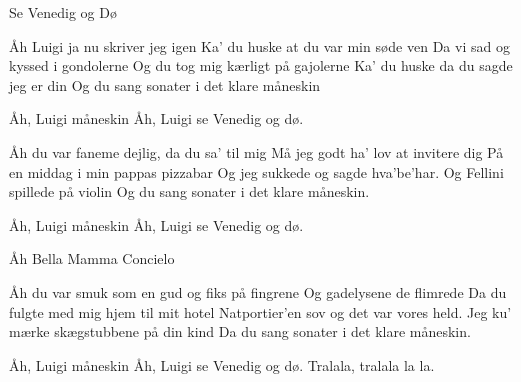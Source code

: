 \begin{sang}{Se Venedig og Dø}{}
\begin{vers}
Åh Luigi ja nu skriver jeg igen
Ka’ du huske at du var min søde ven
Da vi sad og kyssed i gondolerne
Og du tog mig kærligt på gajolerne
Ka’ du huske da du sagde jeg er din
Og du sang sonater i det klare måneskin
\end{vers}

\begin{omkvaed}
Åh, Luigi måneskin
Åh, Luigi se Venedig og dø.
\end{omkvaed}

\begin{vers}
Åh du var faneme dejlig, da du sa’ til mig
Må jeg godt ha’ lov at invitere dig
På en middag i min pappas pizzabar
Og jeg sukkede og sagde hva’be’har.
Og Fellini spillede på violin
Og du sang sonater i det klare måneskin.
\end{vers}

\begin{omkvaed}
Åh, Luigi måneskin
Åh, Luigi se Venedig og dø.

Åh Bella Mamma Concielo
\end{omkvaed}

\begin{vers}
Åh du var smuk som en gud og fiks på fingrene
Og gadelysene de flimrede
Da du fulgte med mig hjem til mit hotel
Natportier’en sov og det var vores held.
Jeg ku’ mærke skægstubbene på din kind
Da du sang sonater i det klare måneskin.
\end{vers}

\begin{omkvaed}
Åh, Luigi måneskin
Åh, Luigi se Venedig og dø.
Tralala, tralala la la.
\end{omkvaed}
\end{sang}
